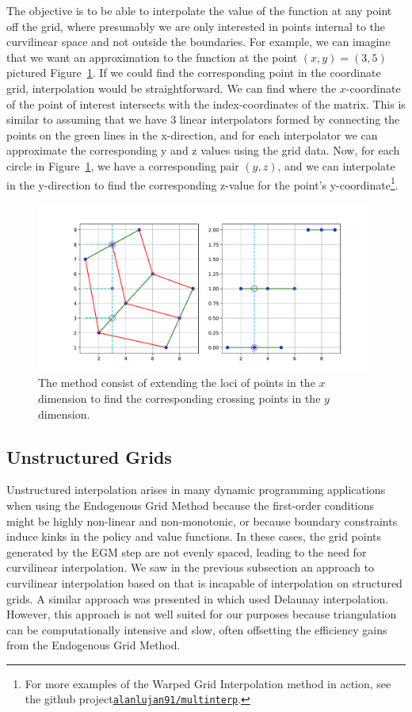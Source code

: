 \documentclass{article}
\begin{document}
The objective is to be able to interpolate the value of the function at any point off the grid, where presumably we are only interested in points internal to the curvilinear space and not outside the boundaries. For example, we can imagine that we want an approximation to the function at the point $(x,y) = (3, 5)$ pictured Figure~\ref{fig:mapping}. If we could find the corresponding point in the coordinate grid, interpolation would be straightforward. We can find where the $x$-coordinate of the point of interest intersects with the index-coordinates of the matrix. This is similar to assuming that we have 3 linear interpolators formed by connecting the points on the green lines in the x-direction, and for each interpolator we can approximate the corresponding y and z values using the grid data. Now, for each circle in Figure~\ref{fig:mapping}, we have a corresponding pair $(y,z)$, and we can interpolate in the y-direction to find the corresponding z-value for the point's y-coordinate\footnote{For more examples of the Warped Grid Interpolation method in action, see the github project\href{https://github.com/alanlujan91/multinterp/blob/main/notebooks/CurvilinearInterpolation.ipynb}{\texttt{alanlujan91/multinterp}}.}.

\begin{figure}[!htbp]
\centering
\includegraphics[width=0.7\linewidth]{files/Mapping-cd6f0ee772a7e079f475e7b52d4449d1.pdf}
\caption{The method consist of extending the loci of points in the $x$ dimension to find the corresponding crossing points in the $y$ dimension.}
\label{fig:mapping}
\end{figure}

\subsection{Unstructured Grids}\label{Unstructured Grids}

Unstructured interpolation arises in many dynamic programming applications when using the Endogenous Grid Method because the first-order conditions might be highly non-linear and non-monotonic, or because boundary constraints induce kinks in the policy and value functions. In these cases, the grid points generated by the EGM step are not evenly spaced, leading to the need for curvilinear interpolation. We saw in the previous subsection an approach to curvilinear interpolation based on \citet{White2015} that is incapable of interpolation on structured grids. A similar approach was presented in \citet{Ludwig2018} which used Delaunay interpolation. However, this approach is not well suited for our purposes because triangulation can be computationally intensive and slow, often offsetting the efficiency gains from the Endogenous Grid Method.
\end{document}
